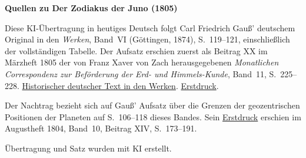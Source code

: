 \clearpage\thispagestyle{empty}
\begin{center}\textbf{Quellen zu Der Zodiakus der Juno (1805)}\end{center}
\noindent Diese KI-Übertragung in heutiges Deutsch folgt Carl Friedrich Gauß’ deutschem Original in den \textit{Werken}, Band~VI (Göttingen, 1874), S.~119--121, einschließlich der vollständigen Tabelle. Der Aufsatz erschien zuerst als Beitrag XX im Märzheft 1805 der von Franz Xaver von Zach herausgegebenen \textit{Monatlichen Correspondenz zur Beförderung der Erd- und Himmels-Kunde}, Band~11, S.~225--228. \href{https://gdz.sub.uni-goettingen.de/id/PPN236007467}{Historischer deutscher Text in den Werken}. \href{https://www.digitale-sammlungen.de/en/view/bsb10538603?page=237}{Erstdruck}.
\par\smallskip\noindent Der Nachtrag bezieht sich auf Gauß’ Aufsatz über die Grenzen der geozentrischen Positionen der Planeten auf S.~106--118 dieses Bandes. Sein \href{https://www.digitale-sammlungen.de/en/view/bsb10538602?page=181}{Erstdruck} erschien im Augustheft 1804, Band~10, Beitrag XIV, S.~173--191.
\par\smallskip\noindent Übertragung und Satz wurden mit KI erstellt.
\clearpage
